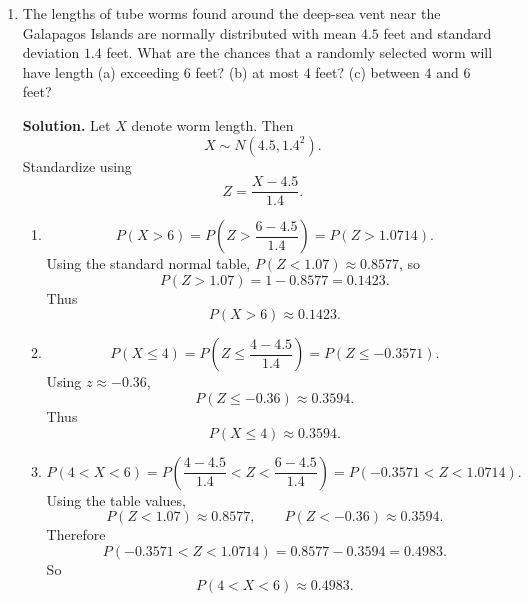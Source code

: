 \documentclass[12pt]{article}
\begin{document}
\begin{enumerate}[label=(\arabic*), leftmargin=*]
\begin{enumerate}[label=(\alph*)]
    For observations $x_1,\dots,x_n$, the likelihood is
    \[
    L(\lambda)=\prod_{i=1}^n \frac{2x_i}{\lambda^2}e^{-(x_i/\lambda)^2}.
    \]
    This simplifies to
    \[
    L(\lambda)=\left(\prod_{i=1}^n 2x_i\right)\lambda^{-2n}\exp\left(-\frac{1}{\lambda^2}\sum_{i=1}^n x_i^2\right).
    \]
    The log-likelihood is
    \[
    \ell(\lambda)=\sum_{i=1}^n \ln(2x_i)-2n\ln\lambda-\frac{1}{\lambda^2}\sum_{i=1}^n x_i^2.
    \]
    Differentiate with respect to $\lambda$:
    \[
    \frac{d\ell}{d\lambda}=-\frac{2n}{\lambda}+\frac{2\sum x_i^2}{\lambda^3}.
    \]
    Set equal to zero:
    \[
    -\frac{2n}{\lambda}+\frac{2\sum x_i^2}{\lambda^3}=0.
    \]
    Multiply through by $\lambda^3/2$:
    \[
    -n\lambda^2+\sum_{i=1}^n x_i^2=0.
    \]
    Therefore
    \[
    \lambda^2=\frac{1}{n}\sum_{i=1}^n x_i^2.
    \]
    Since $\lambda>0$,
    \[
    \hat\lambda_{\mathrm{MLE}}=\sqrt{\frac{1}{n}\sum_{i=1}^n x_i^2}.
    \]
\end{enumerate}

\item The lengths of tube worms found around the deep-sea vent near the Galapagos Islands are normally distributed with mean $4.5$ feet and standard deviation $1.4$ feet. What are the chances that a randomly selected worm will have length (a) exceeding $6$ feet? (b) at most $4$ feet? (c) between $4$ and $6$ feet?

\par\medskip
\noindent\textbf{Solution.}
Let $X$ denote worm length. Then
\[
X\sim N(4.5,1.4^2).
\]
Standardize using
\[
Z=\frac{X-4.5}{1.4}.
\]

\begin{enumerate}[label=(\alph*)]
    \item
    \[
    P(X>6)=P\!\left(Z>\frac{6-4.5}{1.4}\right)=P(Z>1.0714).
    \]
    Using the standard normal table, $P(Z<1.07)\approx 0.8577$, so
    \[
    P(Z>1.07)=1-0.8577=0.1423.
    \]
    Thus
    \[
    P(X>6)\approx 0.1423.
    \]

    \item
    \[
    P(X\le 4)=P\!\left(Z\le\frac{4-4.5}{1.4}\right)=P(Z\le -0.3571).
    \]
    Using $z\approx -0.36$,
    \[
    P(Z\le -0.36)\approx 0.3594.
    \]
    Thus
    \[
    P(X\le 4)\approx 0.3594.
    \]

    \item
    \[
    P(4<X<6)=P\left(\frac{4-4.5}{1.4}<Z<\frac{6-4.5}{1.4}\right)=P(-0.3571<Z<1.0714).
    \]
    Using the table values,
    \[
    P(Z<1.07)\approx 0.8577,
    \qquad
    P(Z<-0.36)\approx 0.3594.
    \]
    Therefore
    \[
    P(-0.3571<Z<1.0714)=0.8577-0.3594=0.4983.
    \]
    So
    \[
    P(4<X<6)\approx 0.4983.
    \]
\end{enumerate}


\end{enumerate}
\end{document}
